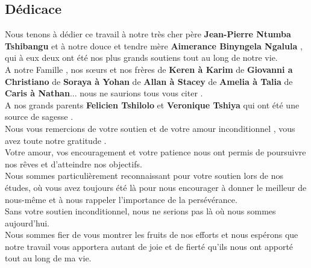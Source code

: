 \begin{center}
	\chapter*{Dédicace}
	\begin{center}
		Nous tenons à dédier ce  travail à notre  très cher père  \textbf{Jean-Pierre Ntumba Tshibangu}  et à notre douce et tendre mère \textbf{Aimerance Binyngela  Ngalula } , qui  à eux deux ont été nos plus grands soutiens tout au long de notre vie.\\
		A  notre Famille , nos sœurs et nos frères   de \textbf{Keren à  Karim } de \textbf{Giovanni a Christiano} de \textbf{Soraya à Yohan} de \textbf{Allan à Stacey}  de \textbf{Amelia à Talia } de \textbf{Caris à Nathan}... nous ne saurions tous vous citer .\\
		
		A nos grands parents \textbf{Felicien Tshilolo} et \textbf{Veronique Tshiya} qui ont été une source de sagesse .\\
		
		Nous  vous remercions de votre soutien et de votre amour inconditionnel , vous avez toute notre gratitude .\\ 
		
		Votre amour, vos encouragement et votre patience nous ont permis de poursuivre nos rêves et d'atteindre nos objectifs.\\
		Nous  sommes particulièrement reconnaissant pour votre soutien lors de nos études, où vous avez  toujours été là pour nous  encourager à donner le meilleur de nous-même et à nous rappeler l'importance de la persévérance.\\
		Sans votre soutien inconditionnel, nous ne serions pas là où nous sommes aujourd'hui.\\
		Nous  sommes fier de vous montrer les fruits de nos efforts et nous espérons que notre  travail vous apportera autant de joie et de fierté qu'ils  nous ont apporté tout au long de ma vie.\\
	\end{center}
	
\end{center}
